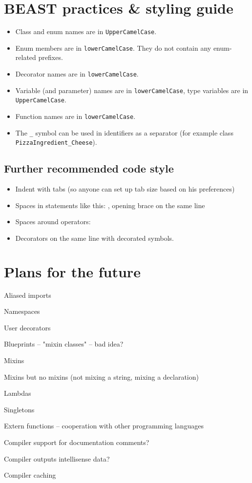 \chapter{BEAST practices \& styling guide}

\begin{itemize}
	\item Class and enum names are in \verb|UpperCamelCase|.
	\item Enum members are in \verb|lowerCamelCase|. They do not contain any enum-related prefixes.
	\item Decorator names are in \verb|lowerCamelCase|.
	\item Variable (and parameter) names are in \verb|lowerCamelCase|, type variables are in \verb|UpperCamelCase|.
	\item Function names are in \verb|lowerCamelCase|.
	\item The \verb|_| symbol can be used in identifiers as a separator (for example class \verb|PizzaIngredient_Cheese|).
\end{itemize}

\section{Further recommended code style}
\begin{itemize}
	\item Indent with tabs (so anyone can set up tab size based on his preferences)
	\item Spaces in statements like this: , opening brace on the same line
	\item Spaces around operators: 
	\item Decorators on the same line with decorated symbols.
\end{itemize}

\chapter{Plans for the future}
\begin{compactitem}
	\item Aliased imports
	\item Namespaces
	\item User decorators
	\item Blueprints -- "mixin classes" -- bad idea?
	\item Mixins
	\item Mixins but no mixins (not mixing a string, mixing a declaration)
	\item Lambdas
	\item Singletons
	\item Extern functions -- cooperation with other programming languages
	\item Compiler support for documentation comments?
	\item Compiler outputs intellisense data?
	\item Compiler caching
\end{compactitem}

